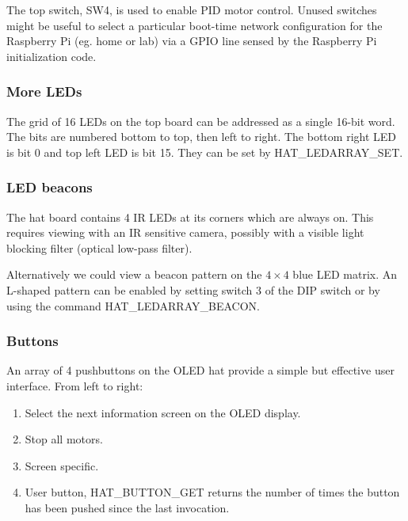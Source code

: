 \documentclass[11pt,fleqn]{article}
\begin{document}
The top switch, SW4, is used to enable PID motor control.
Unused switches might be useful to select a particular boot-time network configuration for the Raspberry Pi (eg. home or lab) via a GPIO line sensed
by the Raspberry Pi initialization code.

\subsubsection{More LEDs}

The grid of 16 LEDs on the top board can be addressed as a single 16-bit word. The bits are numbered bottom to top, then left to right. The bottom right LED is bit 0 and top left LED is bit 15.  They can be set by HAT\_LEDARRAY\_SET.

\subsubsection{LED beacons}

The hat board contains 4 IR LEDs at its corners which are always on.  This requires viewing with an IR sensitive camera, possibly with a
visible light blocking filter (optical low-pass filter).

Alternatively we could view a beacon pattern on the $4\times 4$ blue LED matrix.  An L-shaped pattern can be enabled by setting
switch 3 of the DIP switch or by using the command HAT\_LEDARRAY\_BEACON.


\subsubsection{Buttons}
An array of 4 pushbuttons on the OLED hat provide a simple but effective user interface.  From left to right:
\begin{enumerate}[start=0]
\item Select the next information screen on the OLED display.
\item Stop all motors.
\item Screen specific.
\item User button, HAT\_BUTTON\_GET returns the number of times the button has been pushed since the last invocation.
\end{enumerate}
\end{document}
